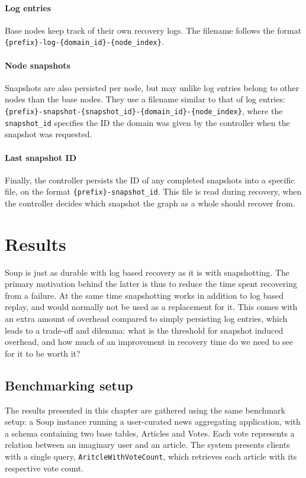 \documentclass[b5paper]{report}
\begin{document}
\subsubsection{Log entries}
Base nodes keep track of their own recovery logs. The filename follows the
format \texttt{\{prefix\}-log-\{domain\_id\}-\{node\_index\}}.

\subsubsection{Node snapshots}
Snapshots are also persisted per node, but may unlike log entries belong to
other nodes than the base nodes. They use a filename similar to that of log
entries:
\texttt{\{prefix\}-snapshot-\{snapshot\_id\}-\{domain\_id\}-\{node\_index\}},
where the \texttt{snapshot\_id} specifies the ID the domain was given by the
controller when the snapshot was requested.

\subsubsection{Last snapshot ID}
Finally, the controller persists the ID of any completed snapshots into a
specific file, on the format \texttt{\{prefix\}-snapshot\_id}. This file is read
during recovery, when the controller decides which snapshot the graph as a whole
should recover from.

\chapter{Results} \label{chap:results}
Soup is just as durable with log based recovery as it is with snapshotting. The
primary motivation behind the latter is thus to reduce the time spent recovering
from a failure. At the same time snapshotting works in addition to log based
replay, and would normally not be used as a replacement for it. This comes with
an extra amount of overhead compared to simply persisting log entries, which
leads to a trade-off and dilemma: what is the threshold for snapshot induced
overhead, and how much of an improvement in recovery time do we need to see for
it to be worth it?

\section{Benchmarking setup} \label{sec:vote}
The results presented in this chapter are gathered using the same benchmark
setup: a Soup instance running a user-curated news aggregating
application, with a schema containing two base tables, Articles and Votes. Each vote
represents a relation between an imaginary user and an article. The system
presents clients with a single query, \texttt{AritcleWithVoteCount}, which
retrieves each article with its respective vote count.
\end{document}

